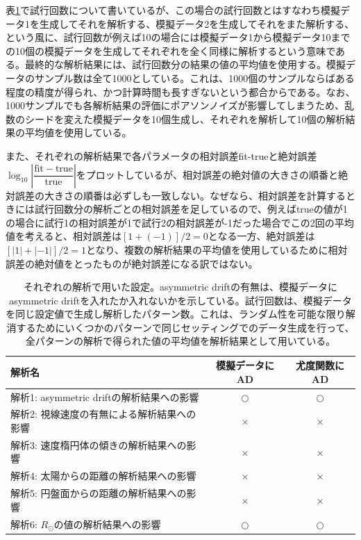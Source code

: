 表\ref{table5}で試行回数について書いているが、この場合の試行回数とはすなわち模擬データ1を生成してそれを解析する、模擬データ2を生成してそれをまた解析する、という風に、試行回数が例えば10の場合には模擬データ1から模擬データ10までの10個の模擬データを生成してそれぞれを全く同様に解析するという意味である。最終的な解析結果には、試行回数分の結果の値の平均値を使用する。模擬データのサンプル数は全て1000としている。これは、1000個のサンプルならばある程度の精度が得られ、かつ計算時間も長すぎないという都合からである。なお、1000サンプルでも各解析結果の評価にポアソンノイズが影響してしまうため、乱数のシードを変えた模擬データを10個生成し、それぞれを解析して10個の解析結果の平均値を使用している。

また、それぞれの解析結果で各パラメータの相対誤差fit-trueと絶対誤差$\log_{10}\left| \dfrac{\mathrm{fit} - \mathrm{true}}{\mathrm{true}}\right|$をプロットしているが、相対誤差の絶対値の大きさの順番と絶対誤差の大きさの順番は必ずしも一致しない。なぜなら、相対誤差を計算するときには試行回数分の解析ごとの相対誤差を足しているので、例えばtrueの値が1の場合に試行1の相対誤差が1で試行2の相対誤差が-1だった場合でこの2回の平均値を考えると、相対誤差は$[1+(-1)]/2=0$となる一方、絶対誤差は$[|1|+|-1|]/2=1$となり、複数の解析結果の平均値を使用しているために相対誤差の絶対値をとったものが絶対誤差になる訳ではない。

\begin{table}
\begin{center}
\begin{tabular}{l|c|c} \hline
 \rowcolor{LightCyan}
 解析名 & 模擬データにAD & 尤度関数にAD \\
 \hline
 解析1: asymmetric driftの解析結果への影響 &$\bigcirc$& $\bigcirc$\\
 \hline
 解析2: 視線速度の有無による解析結果への影響 & $\times$ & $\times$\\
 \hline
 解析3: 速度楕円体の傾きの解析結果への影響 & $\times$ & $\times$\\
 \hline
 解析4: 太陽からの距離の解析結果への影響 & $\times$ & $\times$\\
 \hline
 解析5: 円盤面からの距離の解析結果への影響 & $\times$ & $\times$\\
 \hline
 解析6: $R_{\odot}$の値の解析結果への影響 & $\bigcirc$ & $\bigcirc$\\
 \hline
\end{tabular}
\vspace{3mm}
\caption{それぞれの解析で用いた設定。asymmetric driftの有無は、模擬データにasymmetric driftを入れたか入れないかを示している。試行回数は、模擬データを同じ設定値で生成し解析したパターン数。これは、ランダム性を可能な限り解消するためにいくつかのパターンで同じセッティングでのデータ生成を行って、全パターンの解析で得られた値の平均値を解析結果として用いている。}
\label{table5}
\end{center}
\end{table}

